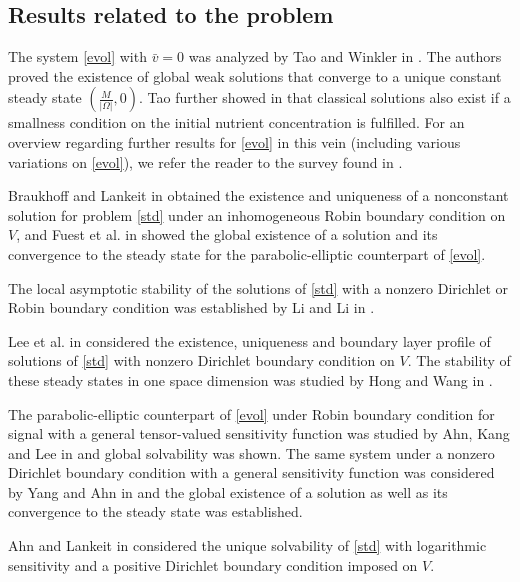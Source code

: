\documentclass[12pt,a4paper]{amsart}
\theoremstyle{definition}
\theoremstyle{remark}
\numberwithin{equation}{section}
\numberwithin{theorem}{section}
\newcommand{\cred}{\color{red}}
\begin{document}
%

\subsection*{Results related to the problem}

The system \eqref{evol} with $\bar{v}=0$ was analyzed by Tao and Winkler in \cite{TWin}. The authors proved the existence of global weak solutions that converge to a unique constant steady state $\left(\frac{M}{|\Omega|},0\right)$. Tao further showed in \cite{TConsumption} that classical solutions also exist if a smallness condition on the initial nutrient concentration is fulfilled. For an overview regarding further results for \eqref{evol} in this vein (including various variations on \eqref{evol}), we refer the reader to the survey found in \cite{LankeitWinklerD}. 
 
Braukhoff and Lankeit in \cite{BrLank} obtained the existence and uniqueness of a nonconstant solution for problem \eqref{std} under an inhomogeneous Robin boundary condition on $V$, and Fuest et al. in \cite{FLM} showed the global existence of a solution and its convergence to the steady state for the parabolic-elliptic counterpart of \eqref{evol}.

The local asymptotic stability of the solutions of \eqref{std} with a nonzero Dirichlet or Robin boundary condition was established by Li and Li in \cite{LiLi}.

Lee et al. in \cite{LeeWangYang} considered the existence, uniqueness and boundary layer profile of solutions of \eqref{std} with nonzero Dirichlet boundary condition on $V$. The stability of these steady states in one space dimension was studied by Hong and Wang in \cite{HongWang}.

The parabolic-elliptic counterpart of \eqref{evol} under Robin boundary condition for signal with a general tensor-valued sensitivity function was studied by Ahn, Kang and Lee in \cite{AhnKangLee} and global solvability was shown. The same system under a nonzero Dirichlet boundary condition with a general sensitivity function was considered by Yang and Ahn in \cite{YangAhn} and the global existence of a solution as well as its convergence to the steady state was established.

Ahn and Lankeit in \cite{AhnLankeit} considered the unique solvability of \eqref{std} with logarithmic sensitivity and a positive Dirichlet boundary condition imposed on $V$.
\end{document}
